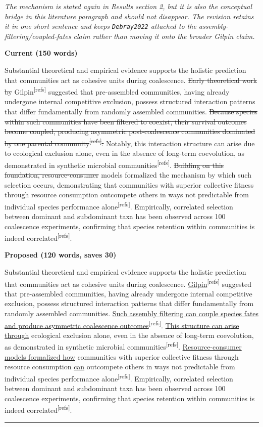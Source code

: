 \documentclass[11pt,a4paper]{article}
\newcommand{\citep}[1]{\textsuperscript{[refs]}}
\newcommand{\cutx}[1]{{\color{CutRed}\sout{#1}}}
\newcommand{\newx}[1]{{\color{CutRed}\uline{#1}}}
\newcommand{\rationale}[1]{{\color{GrayNote}\small\textit{#1}}\par\smallskip}
\newcommand{\panel}[1]{\par\smallskip\noindent\textbf{\small #1}\par}
\newcommand{\decision}{\par\smallskip\noindent{\color{GrayNote}\small$\square$~accept\quad$\square$~reject\quad$\square$~modify}\par
\noindent\rule{\linewidth}{0.4pt}}
\begin{document}
\rationale{The mechanism is stated again in Results section 2, but it is also the conceptual bridge in this literature paragraph and should not disappear. The revision retains it in one short sentence and keeps \texttt{Debray2022} attached to the assembly-filtering/coupled-fates claim rather than moving it onto the broader Gilpin claim.}
\panel{Current (150 words)}
Substantial theoretical and empirical evidence supports the holistic prediction that communities act as cohesive units during coalescence. \cutx{Early theoretical work by }Gilpin\citep{Gilpin1994} suggested that pre-assembled communities, having already undergone internal competitive exclusion, possess structured interaction patterns that differ fundamentally from randomly assembled communities. \cutx{Because species within such communities have been filtered to coexist, their survival outcomes become coupled, producing asymmetric post-coalescence communities dominated by one parental community\citep{Debray2022}. }Notably, this interaction structure can arise due to ecological exclusion alone, even in the absence of long-term coevolution, as demonstrated in synthetic microbial communities\citep{Venturelli2018, Maynard2020}. \cutx{Building on this foundation, resource-consumer} models formalized the mechanism by which such selection occurs, demonstrating that communities with superior collective fitness through resource consumption outcompete others in ways not predictable from individual species performance alone\citep{Tikhonov2016, Lechon2021, Xie2019, Xie2021}. Empirically, correlated selection between dominant and subdominant taxa has been observed across 100 coalescence experiments, confirming that species retention within communities is indeed correlated\citep{DiazColunga2022}.
\panel{Proposed (120 words, saves 30)}
Substantial theoretical and empirical evidence supports the holistic prediction that communities act as cohesive units during coalescence. \newx{Gilpin}\citep{Gilpin1994} suggested that pre-assembled communities, having already undergone internal competitive exclusion, possess structured interaction patterns that differ fundamentally from randomly assembled communities. \newx{Such assembly filtering can couple species fates and produce asymmetric coalescence outcomes}\citep{Debray2022}. \newx{This structure can arise through} ecological exclusion alone, even in the absence of long-term coevolution, as demonstrated in synthetic microbial communities\citep{Venturelli2018, Maynard2020}. \newx{Resource-consumer models formalized how} communities with superior collective fitness through resource consumption \newx{can} outcompete others in ways not predictable from individual species performance alone\citep{Tikhonov2016, Lechon2021, Xie2019, Xie2021}. Empirically, correlated selection between dominant and subdominant taxa has been observed across 100 coalescence experiments, confirming that species retention within communities is indeed correlated\citep{DiazColunga2022}.
\decision
\end{document}
